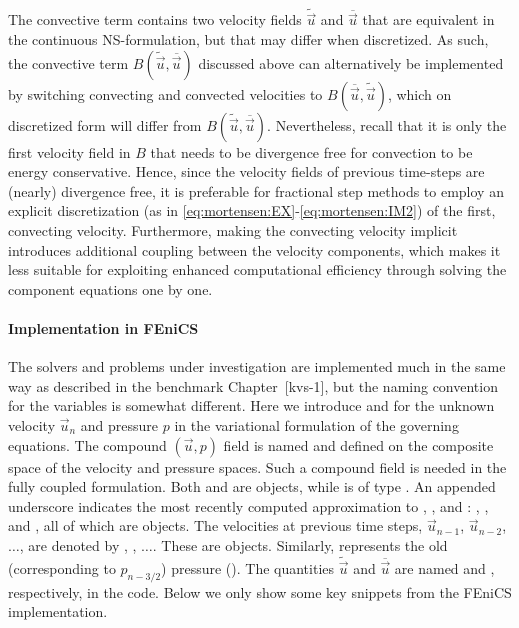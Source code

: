 The convective term contains two velocity fields $\tilde{\vec{u}}$ and
$\overline{\vec{u}}$ that are equivalent in the continuous
NS-formulation, but that may differ when discretized. As such, the
convective term $B(\tilde{\vec{u}},\overline{\vec{u}})$ discussed
above can alternatively be implemented by switching convecting and
convected velocities to $B(\overline{\vec{u}},\tilde{\vec{u}})$, which
on discretized form will differ from
$B(\tilde{\vec{u}},\overline{\vec{u}})$. Nevertheless, recall that it
is only the first velocity field in $B$ that needs to be divergence
free for convection to be energy conservative. Hence, since the
velocity fields of previous time-steps are (nearly) divergence free,
it is preferable for fractional step methods to employ an explicit
discretization (as in
\eqref{eq:mortensen:EX}-\eqref{eq:mortensen:IM2}) of the first,
convecting velocity. Furthermore, making the convecting velocity
implicit introduces additional coupling between the velocity
components, which makes it less suitable for exploiting enhanced
computational efficiency through solving the component equations one
by one.

\paragraph{Implementation in FEniCS}
\label{sec:mortensen:impl_fenics}

The solvers and problems under investigation are implemented much in
the same way as described in the benchmark Chapter~[kvs-1], but the
naming convention for the variables is somewhat different. Here we
introduce  and  for the unknown velocity $\vec{u}_n$ and
pressure $p$ in the variational formulation of the governing
equations. The compound $(\vec{u},p)$ field is named  and
defined on the composite space of the velocity and pressure
spaces. Such a compound field is needed in the fully coupled
formulation.  Both  and  are 
objects, while  is of type .  An appended
underscore indicates the most recently computed approximation to
, , and : , , and ,
all of which are  objects. The velocities at previous
time steps, $\vec{u}_{n-1}$, $\vec{u}_{n-2}$, $\ldots$, are denoted by
, , $\ldots$. These are 
objects. Similarly,  represents the old (corresponding to
$p_{n-3/2}$) pressure (). The quantities
$\tilde{\vec{u}}$ and $\overline{\vec{u}}$ are named 
and , respectively, in the code. Below we only show some
key snippets from the FEniCS implementation.

